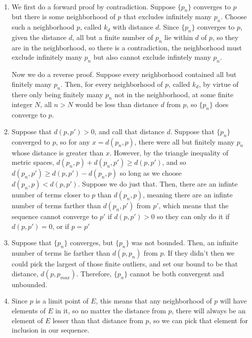 \documentclass{article}
\begin{document}
\begin{customproof}
\

\begin{enumerate}
    \item We first do a forward proof by contradiction. Suppose $\{p_n\}$ converges to $p$ but there is some neighborhood of $p$ that excludes infinitely many $p_n$. Choose such a neighborhood $p$, called $k_d$ with distance $d$. Since $\{p_n\}$ converges to $p$, given the distance $d$, all but a finite number of $p_n$ lie within $d$ of $p$, so they are in the neighborhood, so there is a contradiction, the neighborhood must exclude infinitely many $p_n$ but also cannot exclude infintely many $p_n$.
    
    Now we do a reverse proof. Suppose every neighborhood contained all but finitely many $p_n$. Then, for every neighborhood of $p$, called $k_d$, by virtue of there only being finitely many $p_n$ not in the neighborhood, at some finite integer $N$, all $n > N$ would be less than distance $d$ from $p$, so $\{p_n\}$ does converge to $p$.
    \item Suppose that $d(p,p') > 0$, and call that distance $d$. Suppose that $\{p_n\}$ converged to $p$, so for any $x = d(p_n,p)$, there were all but finitely many $p_n$ whose distance is greater than $x$. However, by the triangle inequality of metric spaces, $d(p_n,p) + d(p_n, p') \geq d(p,p')$, and so $d(p_n,p') \geq d(p,p') - d(p_n,p)$ so long as we choose $d(p_n,p) < d(p,p')$. Suppose we do just that. Then, there are an infinte number of terms closer to $p$ than $d(p_n,p)$, meaning there are an infinte number of terms farther than $d(p_n, p')$ from $p'$, which means that the sequence cannot converge to $p'$ if $d(p,p') > 0$ so they can only do it if $d(p, p') = 0$, or if $p = p'$
    \item Suppose that $\{p_n\}$ converges, but $\{p_n\}$ was not bounded. Then, an infinite number of terms lie farther than $d(p, p_n)$ from $p$. If they didn't then we could pick the largest of those finite outliers, and set our bound to be that distance, $d(p, p_{max})$. Therefore, $\{p_n\}$ cannot be both convergent and unbounded.
    \item Since $p$ is a limit point of $E$, this means that any neighborhood of $p$ will have elements of $E$ in it, so no matter the distance from $p$, there will always be an element of $E$ lesser than that distance from $p$, so we can pick that element for inclusion in our sequence. 

\end{enumerate}
\end{customproof}
\end{document}
